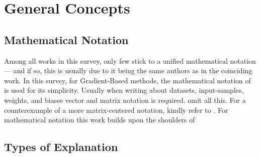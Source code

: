 \section{General Concepts}

\subsection{Mathematical Notation}
Among all works in this survey, only few stick to a unified mathematical notation --- and if so, this is usually due to it being the same authors as in the coinciding work. In this survey, for Gradient-Based methods, the mathematical notation of  is used for its simplicity. Usually when writing about datasets, input-samples, weights, and biases vector and matrix notation is required.  omit all this. For a counterexample of a more matrix-centered notation, kindly refer to .
For mathematical notation this work builds upon the shoulders of~\cite{Kindermans.2018}

\subsection{Types of Explanation}




